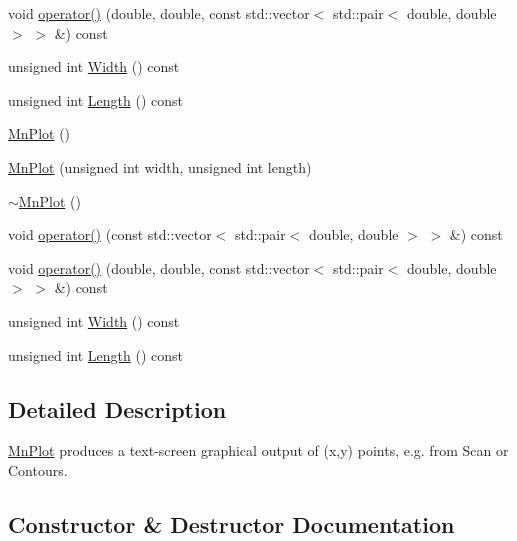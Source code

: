 \begin{DoxyCompactItemize}
\item 
void \mbox{\hyperlink{classROOT_1_1Minuit2_1_1MnPlot_a6cae4ab8961e9f7933320789d101ec1e}{operator()}} (double, double, const std\+::vector$<$ std\+::pair$<$ double, double $>$ $>$ \&) const
\item 
unsigned int \mbox{\hyperlink{classROOT_1_1Minuit2_1_1MnPlot_ae9d97799fcd00d4aa2095884d99dc588}{Width}} () const
\item 
unsigned int \mbox{\hyperlink{classROOT_1_1Minuit2_1_1MnPlot_aefbe338659ecdac9b7ad160472a34221}{Length}} () const
\item 
\mbox{\hyperlink{classROOT_1_1Minuit2_1_1MnPlot_af7943a6243c6f1a96083c875d38f749c}{Mn\+Plot}} ()
\item 
\mbox{\hyperlink{classROOT_1_1Minuit2_1_1MnPlot_ae5a2182c4b4922bd53b7cc1fd8293bea}{Mn\+Plot}} (unsigned int width, unsigned int length)
\item 
\mbox{\hyperlink{classROOT_1_1Minuit2_1_1MnPlot_a959d1e77755e80a3edbdd1e7133f5d83}{$\sim$\+Mn\+Plot}} ()
\item 
void \mbox{\hyperlink{classROOT_1_1Minuit2_1_1MnPlot_a118857899dee9d8222acc5c4926956ca}{operator()}} (const std\+::vector$<$ std\+::pair$<$ double, double $>$ $>$ \&) const
\item 
void \mbox{\hyperlink{classROOT_1_1Minuit2_1_1MnPlot_a6cae4ab8961e9f7933320789d101ec1e}{operator()}} (double, double, const std\+::vector$<$ std\+::pair$<$ double, double $>$ $>$ \&) const
\item 
unsigned int \mbox{\hyperlink{classROOT_1_1Minuit2_1_1MnPlot_ae9d97799fcd00d4aa2095884d99dc588}{Width}} () const
\item 
unsigned int \mbox{\hyperlink{classROOT_1_1Minuit2_1_1MnPlot_aefbe338659ecdac9b7ad160472a34221}{Length}} () const
\end{DoxyCompactItemize}


\subsection{Detailed Description}
\mbox{\hyperlink{classROOT_1_1Minuit2_1_1MnPlot}{Mn\+Plot}} produces a text-\/screen graphical output of (x,y) points, e.\+g. from Scan or Contours. 

\subsection{Constructor \& Destructor Documentation}
\mbox{\label{classROOT_1_1Minuit2_1_1MnPlot_af7943a6243c6f1a96083c875d38f749c}} 
